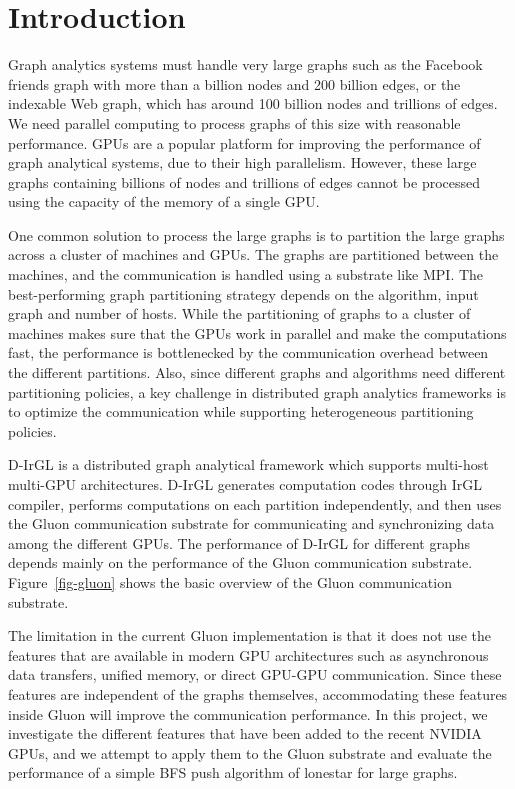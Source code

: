 \section{Introduction}
\label{sec-intro}

Graph analytics systems must handle very large graphs such as the Facebook friends graph with more than a billion nodes and 200 billion edges, or the indexable Web graph, which has around 100 billion nodes and trillions of edges. We need parallel computing to process graphs of this size with reasonable performance. GPUs are a popular platform for improving the performance of graph analytical systems, due to their high parallelism. However, these large graphs containing billions of nodes and trillions of edges cannot be processed using the capacity of the memory of a single GPU. 

One common solution to process the large graphs is to partition the large graphs across a cluster of machines and GPUs. The graphs are partitioned between the machines, and the communication is handled using a substrate like MPI. The best-performing graph partitioning strategy depends on the algorithm, input graph and number of hosts. While the partitioning of graphs to a cluster of machines makes sure that the GPUs work in parallel and make the computations fast, the performance is bottlenecked by the communication overhead between the different partitions. Also, since different graphs and algorithms need different partitioning policies, a key challenge in distributed graph analytics frameworks is to optimize the communication while supporting heterogeneous partitioning policies. 


D-IrGL is a distributed graph analytical framework which supports multi-host multi-GPU architectures. D-IrGL generates computation codes through IrGL compiler,
performs computations on each partition independently, and then uses the Gluon communication substrate for communicating and synchronizing data among the different GPUs. The performance of D-IrGL for different graphs depends mainly on the performance of the Gluon communication substrate. Figure~\ref{fig-gluon} shows the basic overview of the Gluon communication substrate. 

The limitation in the current Gluon implementation is that it does not use the features that are available in modern GPU architectures such as asynchronous data transfers, unified memory, or direct GPU-GPU communication. Since these features are independent of the graphs themselves, accommodating these features inside Gluon will improve the communication performance. In this project, we  investigate the different features that have been added to the recent NVIDIA GPUs, and we attempt to apply them to the Gluon substrate and evaluate the performance of a simple BFS push algorithm of lonestar for large graphs. 

